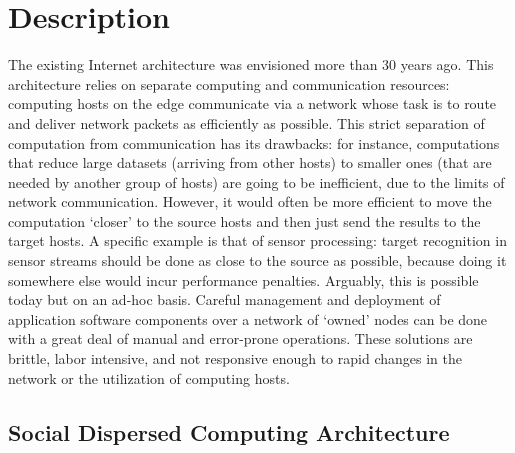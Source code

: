 \documentclass[12pt,letterpaper]{article}
\begin{document}
\thispagestyle{empty}

\clearpage
{} 
\section{Description}
The existing Internet architecture was envisioned more than 30 years ago. This architecture relies on separate computing and communication resources: computing hosts on the edge communicate via a network whose task is to route and deliver network packets as efficiently as possible. This strict separation of computation from communication has its drawbacks: for instance, computations that reduce large datasets (arriving from other hosts) to smaller ones (that are needed by another group of hosts) are going to be inefficient, due to the limits of network communication. However, it would often be more efficient to move the computation `closer' to the source hosts and then just send the results to the target hosts. A specific example is that of sensor processing: target recognition in sensor streams should be done as close to the source as possible, because doing it somewhere else would incur performance penalties.  Arguably, this is possible today but on an ad-hoc basis. Careful management and deployment of application software components over a network of `owned' nodes can be done with a great deal of manual and error-prone operations. These solutions are brittle, labor intensive, and not responsive enough to rapid changes in the network or the utilization of computing hosts. 

\subsection{Social Dispersed Computing Architecture}
\end{document}
